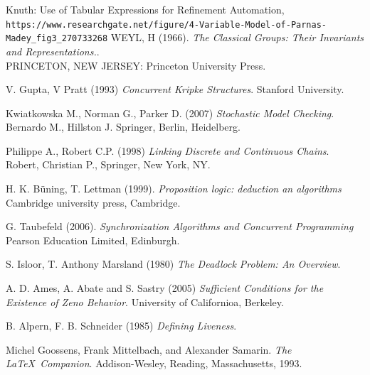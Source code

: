 \documentclass{article}%
\begin{document}
\clearpage  %





\begin{thebibliography}{9}


Knuth: Use of Tabular Expressions for Refinement Automation,
\\\texttt{https://www.researchgate.net/figure/4-Variable-Model-of-Parnas-Madey\_fig3\_270733268}
WEYL, H (1966).
\textit{The Classical Groups: Their Invariants and Representations.}.\\ 
PRINCETON, NEW JERSEY: Princeton University Press.

V. Gupta, V Pratt (1993)
\textit{Concurrent Kripke Structures}. 
Stanford University.

Kwiatkowska M., Norman G., Parker D. (2007)
\textit{Stochastic Model Checking}. 
Bernardo M., Hillston J. Springer, Berlin, Heidelberg.

Philippe A., Robert C.P. (1998)  
\textit{Linking Discrete and Continuous Chains}. 
Robert, Christian P., Springer, New York, NY.

H. K. Büning, T. Lettman (1999).
\textit{Proposition logic: deduction an algorithms}\\
Cambridge university press, Cambridge. 

G. Taubefeld (2006).
\textit{Synchronization Algorithms and Concurrent Programming}\\
Pearson Education Limited, Edinburgh. 

S. Isloor, T. Anthony Marsland (1980)
\textit{The Deadlock Problem: An Overview}. 

A. D. Ames, A. Abate and S. Sastry (2005)
\textit{Sufficient Conditions for the Existence of Zeno Behavior}.
University of Californioa, Berkeley.

B. Alpern, F. B. Schneider (1985)
\textit{Defining Liveness}. 

Michel Goossens, Frank Mittelbach, and Alexander Samarin. 
\textit{The \LaTeX\ Companion}. 
Addison-Wesley, Reading, Massachusetts, 1993.


\end{thebibliography}
\end{document}
